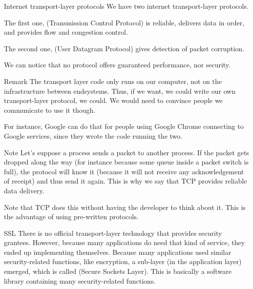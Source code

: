 \documentclass[a4paper]{article}
\begin{document}
\begin{parag}{Internet transport-layer protocols}
    We have two internet transport-layer protocols.

    The first one,  (Transmission Control Protocol) is reliable, delivers data in order, and provides flow and congestion control.

    The second one,  (User Datagram Protocol) gives detection of packet corruption.

    We can notice that no protocol offers guaranteed performance, nor security.

    \begin{subparag}{Remark}
        The transport layer code only runs on our computer, not on the infrastructure between endsystems. Thus, if we want, we could write our own transport-layer protocol, we could. We would need to convince people we communicate to use it though.

        For instance, Google can do that for people using Google Chrome connecting to Google services, since they wrote the code running the two.
    \end{subparag}

    \begin{subparag}{Note}
         Let's suppose a process sends a packet to another process. If the packet gets dropped along the way (for instance because some queue inside a packet switch is full), the protocol will know it (because it will not receive any acknowledgement of receipt) and thus send it again. This is why we say that TCP provides reliable data delivery.

        Note that TCP does this without having the developer to think about it. This is the advantage of using pre-written protocols.
    \end{subparag}
\end{parag}

\begin{parag}{SSL}
    There is no official transport-layer technology that provides security grantees. However, because many applications do need that kind of service, they ended up implementing themselves. Because many applications used similar security-related functions, like encryption, a sub-layer (in the application layer) emerged, which is called  (Secure Sockets Layer). This is basically a software library containing many security-related functions.
\end{parag}
\end{document}
